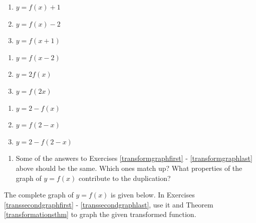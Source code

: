 \begin{multicols}{3}
\begin{enumerate}
\setcounter{enumi}{\value{HW}}

\item $y = f(x) + 1$ \label{transformgraphfirst}
\item $y = f(x) - 2$
\item $y = f(x+1)$

\setcounter{HW}{\value{enumi}}
\end{enumerate}
\end{multicols}

\begin{multicols}{3}
\begin{enumerate}
\setcounter{enumi}{\value{HW}}

\item $y = f(x - 2)$
\item $y = 2f(x)$
\item $y = f(2x)$

\setcounter{HW}{\value{enumi}}
\end{enumerate}
\end{multicols}

\begin{multicols}{3}
\begin{enumerate}
\setcounter{enumi}{\value{HW}}

\item $y = 2 - f(x)$
\item $y = f(2-x)$
\item $y = 2-f(2-x)$ \label{transformgraphlast}

\setcounter{HW}{\value{enumi}}
\end{enumerate}
\end{multicols}


\begin{enumerate}
\setcounter{enumi}{\value{HW}}

\item Some of the answers to Exercises \ref{transformgraphfirst} - \ref{transformgraphlast} above should be the same.  Which ones match up?  What properties of the graph of $y=f(x)$ contribute to the duplication?

\setcounter{HW}{\value{enumi}}
\end{enumerate}

\pagebreak

The complete graph of $y = f(x)$ is given below.  In Exercises \ref{transsecondgraphfirst} - \ref{transsecondgraphlast}, use it and Theorem \ref{transformationsthm} to graph the given transformed function.

